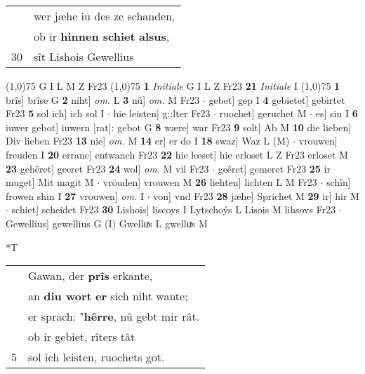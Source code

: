 \documentclass[8pt,a4paper,notitlepage]{article}
\begin{document}
\begin{table}[ht]
\begin{minipage}[t]{0.5\linewidth}
\begin{tabular}{rl}
 & wer jæhe iu des ze schanden,\\ 
 & ob ir \textbf{hinnen schiet} \textbf{alsus},\\ 
30 & sît Lishois Gewellius\\ 
\end{tabular}
\scriptsize
\line(1,0){75} \newline
G I L M Z Fr23 \newline
\line(1,0){75} \newline
\textbf{1} \textit{Initiale} G I L Z Fr23  \textbf{21} \textit{Initiale} I  \newline
\line(1,0){75} \newline
\textbf{1} brîs] brîse G \textbf{2} niht] \textit{om.} L \textbf{3} nû] \textit{om.} M Fr23  $\cdot$ gebet] gep I \textbf{4} gebietet] gebirtet Fr23 \textbf{5} sol ich] ich sol I  $\cdot$ hie leisten] g::lter Fr23  $\cdot$ ruochet] geruchet M  $\cdot$ es] sin I \textbf{6} iuwer gebot] iuwern [rat]: gebot G \textbf{8} wære] war Fr23 \textbf{9} solt] Ab M \textbf{10} die lieben] Div lieben Fr23 \textbf{13} nie] \textit{om.} M \textbf{14} er] er do I \textbf{18} swaz] Waz L (M)  $\cdot$ vrouwen] freuden I \textbf{20} erranc] entwanch Fr23 \textbf{22} hie lœset] hie erloset L Z Fr23 erloset M \textbf{23} gehêret] geeret Fr23 \textbf{24} wol] \textit{om.} M vil Fr23  $\cdot$ geêret] gemeret Fr23 \textbf{25} ir muget] Mit magit M  $\cdot$ vröuden] vrouwen M \textbf{26} liehten] lichten L M Fr23  $\cdot$ schîn] frowen shin I \textbf{27} vrouwen] \textit{om.} I  $\cdot$ von] vnd Fr23 \textbf{28} jæhe] Sprichet M \textbf{29} ir] hir M  $\cdot$ schiet] scheidet Fr23 \textbf{30} Lishois] liscoys I Lytschoýs L Lisois M lihsovs Fr23  $\cdot$ Gewellius] gewellius G (I) Gwelluͯs L gwelluͯs M \newline
\end{minipage}
\hspace{0.5cm}
\begin{minipage}[t]{0.5\linewidth}
\small
\begin{center}*T
\end{center}
\begin{tabular}{rl}
 & Gawan, der \textbf{prîs} erkante,\\ 
 & an \textbf{diu wort} \textbf{er} sich niht wante;\\ 
 & er sprach: "\textbf{hêrre}, nû gebt mir rât.\\ 
 & ob ir gebiet, rîters tât\\ 
5 & sol ich leisten, ruochets got.\\ 

\end{tabular}
\end{minipage}
\end{table}
\end{document}
